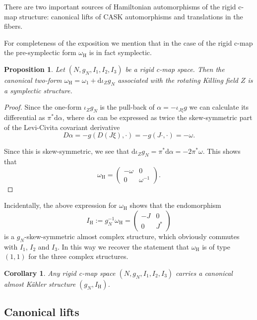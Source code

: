 \documentclass{article}
\newtheorem{corollary}[theorem]{Corollary}
\newtheorem{proposition}[theorem]{Proposition}
\theoremstyle{definition}
\newcommand{\hor}{\mathrm{H}}
\renewcommand{\d}{\mathrm{d}}
\begin{document}
	There are two important sources of Hamiltonian automorphisms of the rigid c-map structure: canonical lifts of CASK automorphisms and translations in the fibers.\medskip
	
	For completeness of the exposition we mention that in the case of the rigid c-map the pre-symplectic form $\omega_\hor$ is in fact symplectic.
	
	\begin{proposition}
		Let $(N,g_N,I_1,I_2,I_3)$ be a rigid c-map space. Then the canonical two-form $\omega_\hor=\omega_1+\d\iota_Zg_N$ associated with the rotating Killing field $Z$ is a symplectic structure.
	\end{proposition}

	\begin{proof}
		Since the one-form $\iota_Zg_N$ is the pull-back of $\alpha=-\iota_{J\xi}g$ we can calculate its differential as $\pi^*\d\alpha$, where $\d\alpha$ can be expressed as twice the skew-symmetric part of the Levi-Civita covariant derivative $$D\alpha=-g(D(J\xi),\cdot)=-g(J\cdot,\cdot)=-\omega.$$
		
		Since this is skew-symmetric, we see that $\d\iota_Zg_N=\pi^*\d\alpha=-2\pi^*\omega$. This shows that \begin{equation}\label{oH:eq}
			\omega_\hor=\begin{pmatrix}
				-\omega&0\\
				0&\omega^{-1}
			\end{pmatrix}.
		\end{equation}
	\end{proof}

	Incidentally, the above expression for $\omega_\hor$ shows that the endomorphism $$I_\hor:=g_N^{-1}\omega_\hor=\begin{pmatrix}
		-J&0\\
		0&J^*
	\end{pmatrix}$$ is a $g_N$-skew-symmetric almost complex structure, which obviously commutes with $I_1$, $I_2$ and $I_3$. In this way we recover the statement that $\omega_\hor$ is of type $(1,1)$ for the three complex structures.

	\begin{corollary}
		Any rigid c-map space $(N,g_N,I_1,I_2,I_3)$ carries a canonical almost K\"ahler structure $(g_N,I_\hor)$.
	\end{corollary}
 
    \subsection{Canonical lifts}
    
\end{document}
